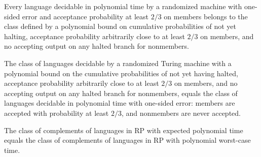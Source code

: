 \begin{theorem}
\label{Randomized.RP_PTM_subset_RP_ExpPTM}
\leanok
{}
Every language decidable in polynomial time by a randomized machine with one-sided error
and acceptance probability at least $2/3$ on members belongs to the class defined by a
polynomial bound on cumulative probabilities of not yet halting, acceptance probability
arbitrarily close to at least $2/3$ on members, and no accepting output on any halted
branch for nonmembers.
\end{theorem}

\begin{theorem}
\label{Randomized.RP_ExpPTM_eq_RP_PTM}
\leanok
{}
The class of languages decidable by a randomized Turing machine with a polynomial bound
on the cumulative probabilities of not yet having halted, acceptance probability
arbitrarily close to at least $2/3$ on members, and no accepting output on any halted
branch for nonmembers, equals the class of languages decidable in polynomial time with
one-sided error: members are accepted with probability at least $2/3$, and nonmembers
are never accepted.
\end{theorem}

\begin{theorem}
\label{Randomized.coRP_ExpPTM_eq_coRP_PTM}
\leanok
{}
The class of complements of languages in RP with expected polynomial time equals the
class of complements of languages in RP with polynomial worst-case time.
\end{theorem}
